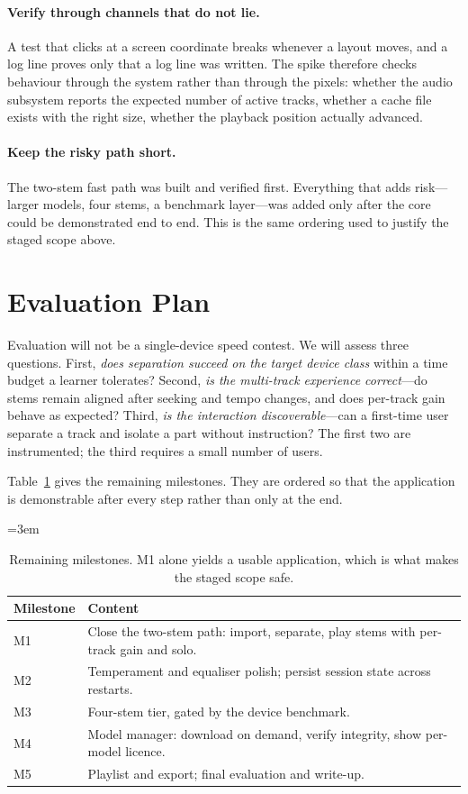 \documentclass[letterpaper]{article} %
\newcommand{\nohyph}{\hyphenpenalty=10000 \exhyphenpenalty=10000 \tolerance=10000 \emergencystretch=3em}
\begin{document}
\paragraph{Verify through channels that do not lie.} A test that clicks at a
screen coordinate breaks whenever a layout moves, and a log line proves only
that a log line was written. The spike therefore checks behaviour through the
system rather than through the pixels: whether the audio subsystem reports the
expected number of active tracks, whether a cache file exists with the right
size, whether the playback position actually advanced.

\paragraph{Keep the risky path short.} The two-stem fast path was built and
verified first. Everything that adds risk---larger models, four stems, a
benchmark layer---was added only after the core could be demonstrated end to
end. This is the same ordering used to justify the staged scope above.

\section{Evaluation Plan}

Evaluation will not be a single-device speed contest. We will assess three
questions. First, \emph{does separation succeed on the target device class}
within a time budget a learner tolerates? Second, \emph{is the multi-track
experience correct}---do stems remain aligned after seeking and tempo changes,
and does per-track gain behave as expected? Third, \emph{is the interaction
discoverable}---can a first-time user separate a track and isolate a part
without instruction? The first two are instrumented; the third requires a small
number of users.

Table~\ref{tab:mile} gives the remaining milestones. They are ordered so that
the application is demonstrable after every step rather than only at the end.

\begin{table}[t]
\begingroup
\centering
\footnotesize
\nohyph
\setlength{\tabcolsep}{3pt}
\begin{tabular}{@{}l >{\raggedright\arraybackslash}p{4.9cm}@{}}
\hline
\textbf{Milestone} & \textbf{Content} \\
\hline
M1 & Close the two-stem path: import, separate, play stems with per-track
     gain and solo. \\
M2 & Temperament and equaliser polish; persist session state across restarts. \\
M3 & Four-stem tier, gated by the device benchmark. \\
M4 & Model manager: download on demand, verify integrity, show per-model
     licence. \\
M5 & Playlist and export; final evaluation and write-up. \\
\hline
\end{tabular}
\caption{Remaining milestones. M1 alone yields a usable application, which is
what makes the staged scope safe.}
\label{tab:mile}
\endgroup
\end{table}
\end{document}
